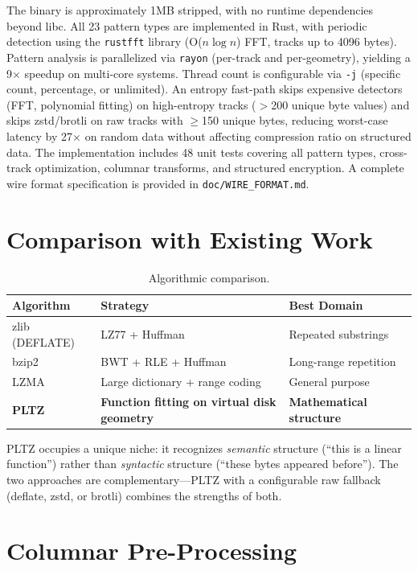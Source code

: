 \documentclass[11pt,a4paper]{article}
\begin{document}
The binary is approximately 1MB stripped, with no runtime dependencies beyond libc. All 23 pattern types are implemented in Rust, with periodic detection using the \texttt{rustfft} library (O($n \log n$) FFT, tracks up to 4096 bytes). Pattern analysis is parallelized via \texttt{rayon} (per-track and per-geometry), yielding a 9$\times$ speedup on multi-core systems. Thread count is configurable via \texttt{-j} (specific count, percentage, or unlimited). An entropy fast-path skips expensive detectors (FFT, polynomial fitting) on high-entropy tracks ($>$200 unique byte values) and skips zstd/brotli on raw tracks with $\geq$150 unique bytes, reducing worst-case latency by 27$\times$ on random data without affecting compression ratio on structured data. The implementation includes 48 unit tests covering all pattern types, cross-track optimization, columnar transforms, and structured encryption. A complete wire format specification is provided in \texttt{doc/WIRE\_FORMAT.md}.

\section{Comparison with Existing Work}

\begin{table}[H]
\centering
\begin{tabular}{@{}lll@{}}
\toprule
\textbf{Algorithm} & \textbf{Strategy} & \textbf{Best Domain} \\
\midrule
zlib (DEFLATE) & LZ77 + Huffman & Repeated substrings \\
bzip2 & BWT + RLE + Huffman & Long-range repetition \\
LZMA & Large dictionary + range coding & General purpose \\
\textbf{PLTZ} & \textbf{Function fitting on virtual disk geometry} & \textbf{Mathematical structure} \\
\bottomrule
\end{tabular}
\caption{Algorithmic comparison.}
\end{table}

PLTZ occupies a unique niche: it recognizes \emph{semantic} structure (``this is a linear function'') rather than \emph{syntactic} structure (``these bytes appeared before''). The two approaches are complementary---PLTZ with a configurable raw fallback (deflate, zstd, or brotli) combines the strengths of both.

\section{Columnar Pre-Processing}
\end{document}
